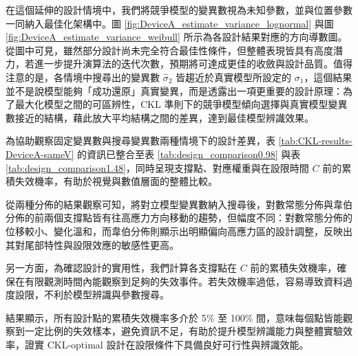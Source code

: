\hspace*{8mm} 在這個延伸的設計情境中，我們將競爭模型的變異數視為未知參數，並與位置參數一同納入最佳化架構中。圖 \ref{fig:DeviceA_estimate_variance_lognormal} 與圖 \ref{fig:DeviceA_estimate_variance_weibull} 所示為各設計結果對應的方向導數圖。從圖中可見，雖然部分設計尚未完全符合最佳性條件，但整體表現皆具有高度潛力，若進一步提升演算法的迭代次數，預期將可達成更佳的收斂與設計品質。值得注意的是，各情境中搜尋出的變異數 $\hat{\sigma}_2$ 皆趨近於真實模型所設定的 $\sigma_1$，這個結果並不是說模型能夠「成功還原」真實變異，而是透露出一項更重要的設計原理：為了最大化模型之間的可區辨性，CKL 準則下的競爭模型傾向選擇與真實模型變異數接近的結構，藉此放大平均結構之間的差異，達到最佳模型辨識效果。

\hspace*{8mm} 為協助觀察固定變異數與搜尋變異數兩種情境下的設計差異，表 \ref{tab:CKL-results-DeviceA-sameV} 的資訊已整合至表 \ref{tab:design_comparison0.98} 與表 \ref{tab:design_comparison1.48}，同時呈現支撐點、對應權重與在設限時間 $C$ 前的累積失效機率，有助於視覺與數值層面的整體比較。

\hspace*{8mm} 從兩種分佈的結果觀察可知，將對立模型變異數納入搜尋後，對數常態分佈與韋伯分佈的前兩個支撐點皆有往高應力方向移動的趨勢，但幅度不同：對數常態分佈的位移較小、變化溫和，而韋伯分佈則顯示出明顯偏向高應力區的設計調整，反映出其對尾部特性與設限效應的敏感性更高。

\hspace*{8mm} 另一方面，為確認設計的實用性，我們計算各支撐點在 $C$ 前的累積失效機率，確保在有限觀測時間內能觀察到足夠的失效事件。若失效機率過低，容易導致資料過度設限，不利於模型辨識與參數搜尋。

\hspace*{8mm} 結果顯示，所有設計點的累積失效機率多介於 5\% 至 100\% 間，意味每個點皆能觀察到一定比例的失效樣本，避免資訊不足，有助於提升模型辨識能力與整體實驗效率，證實 CKL-optimal 設計在設限條件下具備良好可行性與辨識效能。

